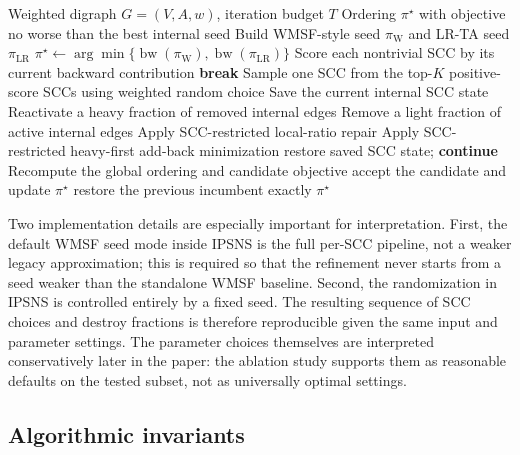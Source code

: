 \begin{algorithm}[t]
\caption{IPSNS with incumbent protection}
\label{alg:ipsns}
\begin{algorithmic}[1]
\Require Weighted digraph \(G=(V,A,w)\), iteration budget \(T\)
\Ensure Ordering \(\pi^\star\) with objective no worse than the best internal seed
\State Build WMSF-style seed \(\pi_{\mathrm{W}}\) and LR-TA seed \(\pi_{\mathrm{LR}}\)
\State \(\pi^\star \gets \arg\min\{\operatorname{bw}(\pi_{\mathrm{W}}),\operatorname{bw}(\pi_{\mathrm{LR}})\}\)
    \State Score each nontrivial SCC by its current backward contribution
        \State \textbf{break}
    \EndIf
    \State Sample one SCC from the top-\(K\) positive-score SCCs using weighted random choice
    \State Save the current internal SCC state
    \State Reactivate a heavy fraction of removed internal edges
    \State Remove a light fraction of active internal edges
    \State Apply SCC-restricted local-ratio repair
    \State Apply SCC-restricted heavy-first add-back minimization
        \State restore saved SCC state; \textbf{continue}
    \EndIf
    \State Recompute the global ordering and candidate objective
        \State accept the candidate and update \(\pi^\star\)
    \Else
        \State restore the previous incumbent exactly
    \EndIf
\EndFor
\State \Return \(\pi^\star\)
\end{algorithmic}
\end{algorithm}

Two implementation details are especially important for interpretation. First, the default WMSF seed mode inside IPSNS is the full per-SCC pipeline, not a weaker legacy approximation; this is required so that the refinement never starts from a seed weaker than the standalone WMSF baseline. Second, the randomization in IPSNS is controlled entirely by a fixed seed. The resulting sequence of SCC choices and destroy fractions is therefore reproducible given the same input and parameter settings. The parameter choices themselves are interpreted conservatively later in the paper: the ablation study supports them as reasonable defaults on the tested subset, not as universally optimal settings.

\subsection{Algorithmic invariants}
\label{subsec:invariants}

